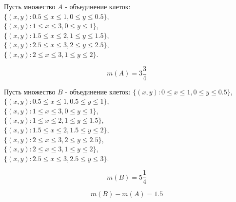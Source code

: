 \documentclass{report}
\begin{document}
Пусть множество $A$ - объединение клеток:\\
$\{(x, y): 0.5 \leq x \leq 1, 0 \leq y \leq 0.5\}$,\\
$\{(x, y): 1 \leq x \leq 3, 0 \leq y \leq 1\}$,\\
$\{(x, y): 1.5 \leq x \leq 2, 1 \leq y \leq 1.5\}$,\\
$\{(x, y): 2.5 \leq x \leq 3, 2 \leq y \leq 2.5\}$,\\
$\{(x, y): 2 \leq x \leq 3, 1 \leq y \leq 2\}$.

\[m(A) = 3\frac{3}{4}\]

Пусть множество $B$ - объединение клеток:
$\{(x, y): 0 \leq x \leq 1, 0 \leq y \leq 0.5\}$,\\
$\{(x, y): 0.5 \leq x \leq 1, 0.5 \leq y \leq 1\}$,\\
$\{(x, y): 1 \leq x \leq 3, 0 \leq y \leq 1\}$,\\
$\{(x, y): 1 \leq x \leq 2, 1 \leq y \leq 1.5\}$,\\
$\{(x, y): 1.5 \leq x \leq 2, 1.5 \leq y \leq 2\}$,\\
$\{(x, y): 2 \leq x \leq 3, 2 \leq y \leq 2.5\}$,\\
$\{(x, y): 2 \leq x \leq 3, 1 \leq y \leq 2\}$,\\
$\{(x, y): 2.5 \leq x \leq 3, 2.5 \leq y \leq 3\}$.

\[m(B) = 5\frac{1}{4}\]

\[m(B) - m(A) = 1.5\]
\newpage
\end{document}
